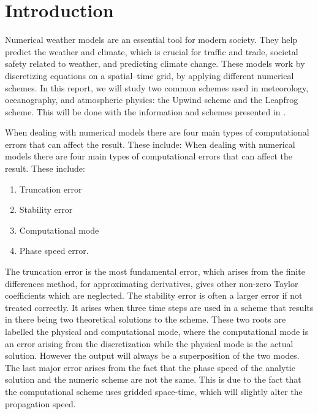 \section{Introduction}
Numerical weather models are an essential tool for modern society. They help predict the weather and climate, which is crucial for traffic and trade, societal safety related to weather, and predicting climate change. These models work by discretizing equations on a spatial--time grid, by applying different numerical schemes. In this report, we will study two common schemes used in meteorology, oceanography, and atmospheric physics: the Upwind scheme and the Leapfrog scheme. This will be done with the information and schemes presented in \citet{Doos2022}.

When dealing with numerical models there are four main types of computational errors that can affect the result. These include: 
When dealing with numerical models there are four main types of computational errors that can affect the result. These include:
\begin{center}
\begin{minipage}{0.5\textwidth}
\begin{enumerate}
    \item Truncation error
    \item Stability error
    \item Computational mode
    \item Phase speed error.
\end{enumerate}
\end{minipage}
\end{center}
The truncation error is the most fundamental error, which arises from the finite differences method, for approximating derivatives, gives other non-zero Taylor coefficients which are neglected. The stability error is often a larger error if not treated correctly. It arises when three time steps are used in a scheme that results in there being two theoretical solutions to the scheme. These two roots are labelled the physical and computational mode, where the computational mode is an error arising from the discretization while the physical mode is the actual solution. However the output will always be a superposition of the two modes. The last major error arises from the fact that the phase speed of the analytic solution and the numeric scheme are not the same. This is due to the fact that the computational scheme uses gridded space-time, which will slightly alter the propagation speed.

